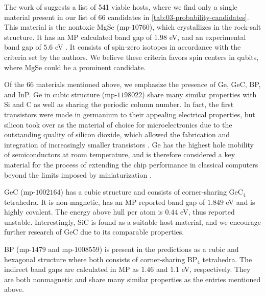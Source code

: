 

The work of \citeauthor{Ferrenti2020} \cite{Ferrenti2020} suggests a list of 541 viable hosts, where we find only a single material present in our list of $66$ candidates in \autoref{tab:03-probability-candidates}. This material is the nontoxic MgSe (mp-$10760$), which crystallizes in the rock-salt structure.
It has an MP calculated band gap of $1.98$ eV, and an experimental band gap of $5.6$ eV \cite{SaumGeorge1959}. It consists of spin-zero isotopes in accordance with the criteria set by the authors. We believe these criteria favors spin centers in qubits, where MgSe could be a prominent candidate.

Of the $66$ materials mentioned above, we emphasize the presence of Ge, GeC, BP, and InP. Ge in cubic structure (mp-$1198022$) share many similar properties with Si and C as well as sharing the periodic column number. In fact, the first transistors were made in germanium to their appealing electrical properties, but silicon took over as the material of choice for microelectronics due to the outstanding quality of silicon dioxide, which allowed the fabrication and integration of increasingly smaller transistors \cite{Scappucci2020, Pillarisetty2011}. Ge has the highest hole mobility of semiconductors at room temperature, and is therefore considered a key material for the process of extending the chip performance in classical computers beyond the limits imposed by miniaturization \cite{Scappucci2020}.

GeC (mp-$1002164$) has a cubic structure and consists of corner-sharing GeC$_4$ tetrahedra. It is non-magnetic, has an MP reported band gap of $1.849$ eV and is highly covalent. The energy above hull per atom is $0.44$ eV, thus reported unstable. Interestingly, SiC is found as a suitable host material, and we encourage further research of GeC due to its comparable properties.

BP (mp-$1479$ and mp-$1008559$) is present in the predictions as a cubic and hexagonal structure where both consists of corner-sharing BP$_4$ tetrahedra. The indirect band gaps are calculated in MP as $1.46$ and $1.1$ eV, respectively. They are both nonmagnetic and share many similar properties as the entries mentioned above.

